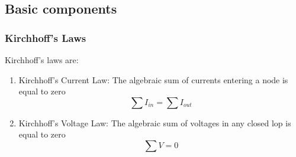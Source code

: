 \documentclass[11pt,titlepage]{article}
\numberwithin{equation}{subsection}
\begin{document}
\subsection{Basic components}
\subsubsection{Kirchhoff's Laws}
Kirchhoff's laws are:
\begin{enumerate}
    \item Kirchhoff's Current Law: The algebraic sum of currents entering a node is equal to zero
\begin{equation}
    \sum I_{in}=\sum I_{out}
\end{equation}
\item Kirchhoff's Voltage Law: The algebraic sum of voltages in any closed lop is equal to zero 
\begin{equation}
    \sum V=0
\end{equation}
\end{enumerate}
\end{document}
